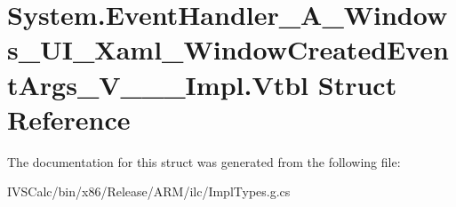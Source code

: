\hypertarget{struct_system_1_1_event_handler___a___windows___u_i___xaml___window_created_event_args___v_______impl_1_1_vtbl}{}\section{System.\+Event\+Handler\+\_\+\+A\+\_\+\+Windows\+\_\+\+U\+I\+\_\+\+Xaml\+\_\+\+Window\+Created\+Event\+Args\+\_\+\+V\+\_\+\+\_\+\+\_\+\+Impl.\+Vtbl Struct Reference}
\label{struct_system_1_1_event_handler___a___windows___u_i___xaml___window_created_event_args___v_______impl_1_1_vtbl}


The documentation for this struct was generated from the following file\+:\begin{DoxyCompactItemize}
\item 
I\+V\+S\+Calc/bin/x86/\+Release/\+A\+R\+M/ilc/Impl\+Types.\+g.\+cs\end{DoxyCompactItemize}
